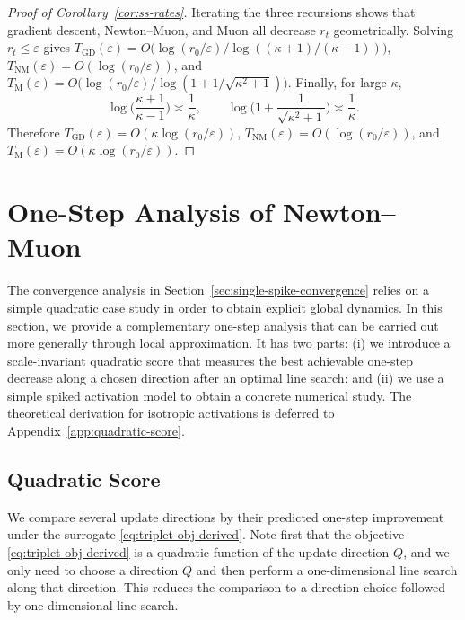 \documentclass[11pt]{article}
\begin{document}
\begin{proof}[Proof of Corollary~\ref{cor:ss-rates}]
Iterating the three recursions shows that gradient descent, Newton--Muon, and Muon all decrease $r_t$ geometrically. Solving $r_t\le \varepsilon$ gives $T_{\mathrm{GD}}(\varepsilon)=O\big(\log(r_0/\varepsilon)/\log((\kappa+1)/(\kappa-1))\big)$, $T_{\mathrm{NM}}(\varepsilon)=O(\log(r_0/\varepsilon))$, and $T_{\mathrm{M}}(\varepsilon)=O\big(\log(r_0/\varepsilon)/\log(1+1/\sqrt{\kappa^2+1})\big)$. Finally, for large $\kappa$,
\[
\log\Big(\frac{\kappa+1}{\kappa-1}\Big)\asymp \frac{1}{\kappa},
\qquad
\log\Big(1+\frac{1}{\sqrt{\kappa^2+1}}\Big)\asymp \frac{1}{\kappa}.
\]
Therefore $T_{\mathrm{GD}}(\varepsilon)=O(\kappa\log(r_0/\varepsilon))$, $T_{\mathrm{NM}}(\varepsilon)=O(\log(r_0/\varepsilon))$, and $T_{\mathrm{M}}(\varepsilon)=O(\kappa\log(r_0/\varepsilon))$.
\end{proof}


\section{One-Step Analysis of Newton--Muon}
\label{sec:numerical-sim}

The convergence analysis in Section~\ref{sec:single-spike-convergence} relies on a simple quadratic case study in order to obtain explicit global dynamics. In this section, we provide a complementary one-step analysis that can be carried out more generally through local approximation.
It has two parts: (i) we introduce a scale-invariant quadratic score that measures the best achievable one-step decrease along a chosen direction after an optimal line search; and (ii) we use a simple spiked activation model to obtain a concrete numerical study. The theoretical derivation for isotropic activations is deferred to Appendix~\ref{app:quadratic-score}.

\subsection{Quadratic Score}

We compare several update directions by their predicted one-step improvement under the surrogate \eqref{eq:triplet-obj-derived}. 
Note first that the objective \eqref{eq:triplet-obj-derived} is a quadratic function of the update
direction ${Q}$, and we only need to choose a direction ${Q}$ and then perform a one-dimensional line search along that direction. This reduces the comparison to a direction choice followed by one-dimensional line search.
\end{document}
